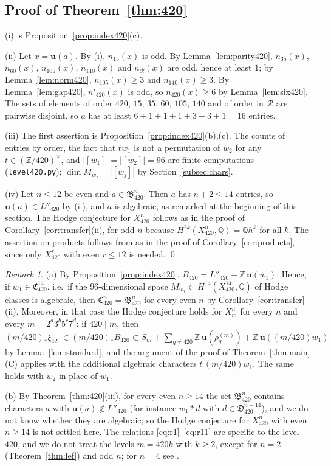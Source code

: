 \documentclass[11pt]{amsart}
\theoremstyle{definition}
\theoremstyle{remark}
\newtheorem{remark}[theorem]{Remark}
\numberwithin{equation}{section}
\newcommand{\Q}{\mathbb{Q}}
\newcommand{\Z}{\mathbb{Z}}
\newcommand{\fB}{\mathfrak{B}}
\newcommand{\fC}{\mathfrak{C}}
\newcommand{\fD}{\mathfrak{D}}
\newcommand{\cR}{\mathcal{R}}
\newcommand{\uu}{\mathbf{u}}
\begin{document}
\subsection{\texorpdfstring{Proof of Theorem~\ref{thm:420}}{Proof of Theorem 8.1}}\label{subsec:proof420}
(i) is Proposition~\ref{prop:index420}(c).

(ii) Let $x=\uu(a)$. By (i), $n_{15}(x)$ is odd. By Lemma~\ref{lem:parity420}, $n_{35}(x)$, $n_{60}(x)$, $n_{105}(x)$, $n_{140}(x)$ and $n_\cR(x)$ are odd, hence at least $1$; by Lemma~\ref{lem:norm420}, $n_{105}(x)\ge3$ and $n_{140}(x)\ge3$. By Lemma~\ref{lem:gap420}, $n'_{420}(x)$ is odd, so $n_{420}(x)\ge6$ by Lemma~\ref{lem:six420}. The sets of elements of order $420$, $15$, $35$, $60$, $105$, $140$ and of order in $\cR$ are pairwise disjoint, so $a$ has at least $6+1+1+1+3+3+1=16$ entries.

(iii) The first assertion is Proposition~\ref{prop:index420}(b),(c). The counts of entries by order, the fact that $t w_1$ is not a permutation of $w_2$ for any $t\in(\Z/420)^\times$, and $|[w_1]|=|[w_2]|=96$ are finite computations (\texttt{level420.py}); $\dim M_{w_j}=|[w_j]|$ by Section~\ref{subsec:chars}.

(iv) Let $n\le12$ be even and $a\in\fB^n_{420}$. Then $a$ has $n+2\le14$ entries, so $\uu(a)\in L''_{420}$ by (ii), and $a$ is algebraic, as remarked at the beginning of this section. The Hodge conjecture for $X^n_{420}$ follows as in the proof of Corollary~\ref{cor:transfer}(ii), for odd $n$ because $H^{2k}(X^n_{420},\Q)=\Q h^k$ for all $k$. The assertion on products follows from \cite[Thm.~IV]{Sh79} as in the proof of Corollary~\ref{cor:products}, since only $X^r_{420}$ with even $r\le12$ is needed. \qed

\begin{remark}\label{rem:420open}
(a) By Proposition~\ref{prop:index420}, $B_{420}=L''_{420}+\Z\,\uu(w_1)$. Hence, if $w_1\in\fC^{14}_{420}$, i.e.\ if the $96$-dimensional space $M_{w_1}\subset H^{14}(X^{14}_{420},\Q)$ of Hodge classes is algebraic, then $\fC^n_{420}=\fB^n_{420}$ for every even $n$ by Corollary~\ref{cor:transfer}(ii). Moreover, in that case the Hodge conjecture holds for $X^n_m$ for every $n$ and every $m=2^a3^b5^c7^d$: if $420\mid m$, then $(m/420)_*\xi_{420}\in(m/420)_*B_{420}\subset S_m+\sum_{q\ne420}\Z\,\uu(\rho^{(m)}_q)+\Z\,\uu((m/420)w_1)$ by Lemma~\ref{lem:standard}, and the argument of the proof of Theorem~\ref{thm:main}(C) applies with the additional algebraic characters $t\,(m/420)w_1$. The same holds with $w_2$ in place of $w_1$.

(b) By Theorem~\ref{thm:420}(iii), for every even $n\ge14$ the set $\fB^n_{420}$ contains characters $a$ with $\uu(a)\notin L''_{420}$ (for instance $w_1*d$ with $d\in\fD^{n-14}_{420}$), and we do not know whether they are algebraic; so the Hodge conjecture for $X^n_{420}$ with even $n\ge14$ is not settled here. The relations \eqref{eq:r1}--\eqref{eq:r11} are specific to the level $420$, and we do not treat the levels $m=420k$ with $k\ge2$, except for $n=2$ (Theorem~\ref{thm:lef}) and odd $n$; for $n=4$ see \cite[Cor.~3.2]{Ka16}.
\end{remark}
\end{document}
